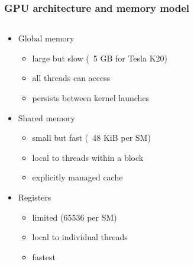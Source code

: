 \begin{frame}
\frametitle{GPU architecture and memory model}
\pause
\begin{columns}
\begin{column}{0.5\textwidth}
\begin{itemize}
    \item Global memory{
        \begin{itemize}
            \item large but slow (~5 GB for Tesla K20)
            \item all threads can access
            \item persists between kernel launches
        \end{itemize}}
    \item Shared memory{
        \begin{itemize}
            \item small but fast (~48 KiB per SM)
            \item local to threads within a block
            \item explicitly managed cache
        \end{itemize}}
    \item Registers{
        \begin{itemize}
            \item limited (65536 per SM)
            \item local to individual threads
            \item fastest
        \end{itemize}}
\end{itemize}
\end{column}
\begin{column}{0.5\textwidth}
\end{column}
\end{columns}
\end{frame}

